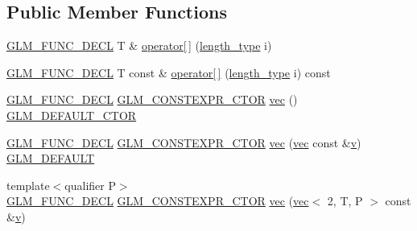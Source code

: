 \subsection*{Public Member Functions}
\begin{DoxyCompactItemize}
\item 
\hyperlink{setup_8hpp_ab2d052de21a70539923e9bcbf6e83a51}{G\+L\+M\+\_\+\+F\+U\+N\+C\+\_\+\+D\+E\+CL} T \& \hyperlink{structglm_1_1vec_3_012_00_01_t_00_01_q_01_4_abfa1d6705c2f4956cb7beccc917de27d}{operator\mbox{[}$\,$\mbox{]}} (\hyperlink{structglm_1_1vec_3_012_00_01_t_00_01_q_01_4_af8b652526ec88c8513b2a8c05bf92441}{length\+\_\+type} i)
\item 
\hyperlink{setup_8hpp_ab2d052de21a70539923e9bcbf6e83a51}{G\+L\+M\+\_\+\+F\+U\+N\+C\+\_\+\+D\+E\+CL} T const  \& \hyperlink{structglm_1_1vec_3_012_00_01_t_00_01_q_01_4_ac475335b291db6f155d9d8f4ab3b6373}{operator\mbox{[}$\,$\mbox{]}} (\hyperlink{structglm_1_1vec_3_012_00_01_t_00_01_q_01_4_af8b652526ec88c8513b2a8c05bf92441}{length\+\_\+type} i) const
\item 
\hyperlink{setup_8hpp_ab2d052de21a70539923e9bcbf6e83a51}{G\+L\+M\+\_\+\+F\+U\+N\+C\+\_\+\+D\+E\+CL} \hyperlink{setup_8hpp_ad34178a09666081abdb573c14d1f4a5a}{G\+L\+M\+\_\+\+C\+O\+N\+S\+T\+E\+X\+P\+R\+\_\+\+C\+T\+OR} \hyperlink{structglm_1_1vec_3_012_00_01_t_00_01_q_01_4_a5f9f2f93b75d46552dc284dcbc1bb2d5}{vec} () \hyperlink{setup_8hpp_afb97a4e995bc004c0cbbfa22125b80ba}{G\+L\+M\+\_\+\+D\+E\+F\+A\+U\+L\+T\+\_\+\+C\+T\+OR}
\item 
\hyperlink{setup_8hpp_ab2d052de21a70539923e9bcbf6e83a51}{G\+L\+M\+\_\+\+F\+U\+N\+C\+\_\+\+D\+E\+CL} \hyperlink{setup_8hpp_ad34178a09666081abdb573c14d1f4a5a}{G\+L\+M\+\_\+\+C\+O\+N\+S\+T\+E\+X\+P\+R\+\_\+\+C\+T\+OR} \hyperlink{structglm_1_1vec_3_012_00_01_t_00_01_q_01_4_ad1785b216e3d6fa5f833c4cd58863cc4}{vec} (\hyperlink{structglm_1_1vec}{vec} const \&\hyperlink{_s_d_l__opengl_8h_a10a82eabcb59d2fcd74acee063775f90}{v}) \hyperlink{setup_8hpp_aefce7051c376a64ba89fa93a9f63bc2c}{G\+L\+M\+\_\+\+D\+E\+F\+A\+U\+LT}
\item 
{\footnotesize template$<$qualifier P$>$ }\\\hyperlink{setup_8hpp_ab2d052de21a70539923e9bcbf6e83a51}{G\+L\+M\+\_\+\+F\+U\+N\+C\+\_\+\+D\+E\+CL} \hyperlink{setup_8hpp_ad34178a09666081abdb573c14d1f4a5a}{G\+L\+M\+\_\+\+C\+O\+N\+S\+T\+E\+X\+P\+R\+\_\+\+C\+T\+OR} \hyperlink{structglm_1_1vec_3_012_00_01_t_00_01_q_01_4_a7eb23dcef5e913dc1e07d004db53d201}{vec} (\hyperlink{structglm_1_1vec}{vec}$<$ 2, T, P $>$ const \&\hyperlink{_s_d_l__opengl_8h_a10a82eabcb59d2fcd74acee063775f90}{v})

\end{DoxyCompactItemize}
